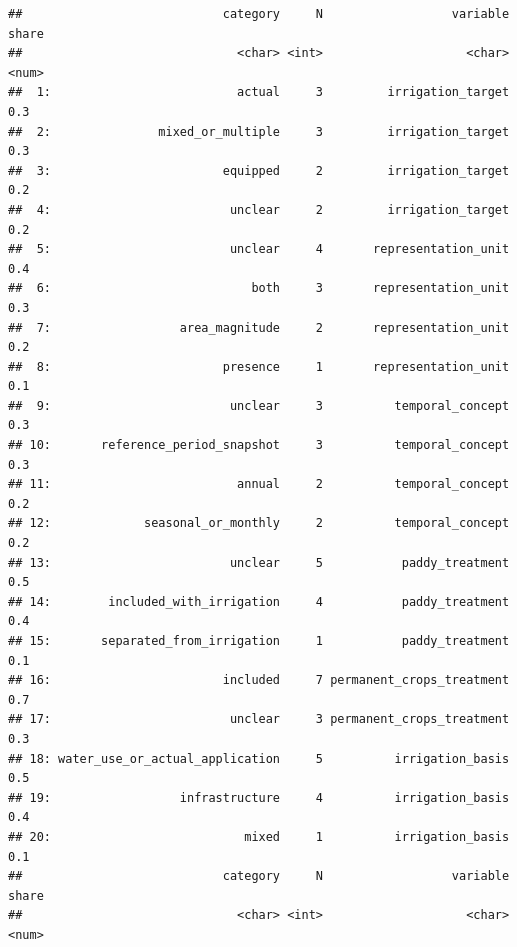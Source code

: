 \documentclass[
  11pt,
]{article}
\begin{document}
\begin{verbatim}
##                            category     N                  variable share
##                              <char> <int>                    <char> <num>
##  1:                          actual     3         irrigation_target   0.3
##  2:               mixed_or_multiple     3         irrigation_target   0.3
##  3:                        equipped     2         irrigation_target   0.2
##  4:                         unclear     2         irrigation_target   0.2
##  5:                         unclear     4       representation_unit   0.4
##  6:                            both     3       representation_unit   0.3
##  7:                  area_magnitude     2       representation_unit   0.2
##  8:                        presence     1       representation_unit   0.1
##  9:                         unclear     3          temporal_concept   0.3
## 10:       reference_period_snapshot     3          temporal_concept   0.3
## 11:                          annual     2          temporal_concept   0.2
## 12:             seasonal_or_monthly     2          temporal_concept   0.2
## 13:                         unclear     5           paddy_treatment   0.5
## 14:        included_with_irrigation     4           paddy_treatment   0.4
## 15:       separated_from_irrigation     1           paddy_treatment   0.1
## 16:                        included     7 permanent_crops_treatment   0.7
## 17:                         unclear     3 permanent_crops_treatment   0.3
## 18: water_use_or_actual_application     5          irrigation_basis   0.5
## 19:                  infrastructure     4          irrigation_basis   0.4
## 20:                           mixed     1          irrigation_basis   0.1
##                            category     N                  variable share
##                              <char> <int>                    <char> <num>
\end{verbatim}
\end{document}

